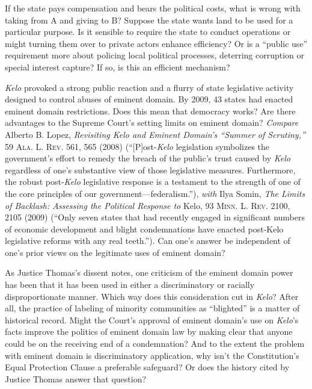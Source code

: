 
\item If the state pays compensation and bears the political costs, what is
wrong with taking from A and giving to B? Suppose the state wants land to be
used for a particular purpose. Is it sensible to require the state to conduct
operations or might turning them over to private actors enhance efficiency? Or
is a ``public use'' requirement more about policing local political processes,
deterring corruption or special interest capture? If so, is this an efficient
mechanism? 

\item \textit{Kelo} provoked a strong public reaction and a flurry of state
legislative activity designed to control abuses of eminent domain. By 2009, 43
states had enacted eminent domain restrictions. Does this mean that democracy
works? Are there advantages to the Supreme Court's setting limits on eminent
domain? \textit{Compare} Alberto B. Lopez, \textit{Revisiting Kelo and Eminent
Domain's ``Summer of Scrutiny,''} 59 \textsc{Ala. L. Rev.} 561, 565 (2008)
(``[P]ost-\textit{Kelo} legislation symbolizes the government's effort to remedy
the breach of the public's trust caused by \textit{Kelo} regardless of one's
substantive view of those legislative measures. Furthermore, the robust
post-\textit{Kelo} legislative response is a testament to the strength of one of
the core principles of our government---federalism.''), \textit{with} Ilya
Somin, \textit{The Limits of Backlash: Assessing the Political Response to}
Kelo, 93 \textsc{Minn. L. Rev}. 2100, 2105 (2009) (``Only seven states that had
recently engaged in significant numbers of economic development and blight
condemnations have enacted post-Kelo legislative reforms with any real
teeth.''). Can one's answer be independent of one's prior views on the
legitimate uses of eminent domain?

\item As Justice Thomas's dissent notes, one criticism of the eminent domain
power has been that it has been used in either a discriminatory or racially
disproportionate manner. Which way does this consideration cut in \textit{Kelo}?
After all, the practice of labeling of minority communities as ``blighted'' is a
matter of historical record. Might the Court's approval of eminent domain's use
on \textit{Kelo}'s facts improve the politics of eminent domain law by making
clear that anyone could be on the receiving end of a condemnation? And to the
extent the problem with eminent domain is discriminatory application, why isn't
the Constitution's Equal Protection Clause a preferable safeguard? Or does the
history cited by Justice Thomas answer that question?

